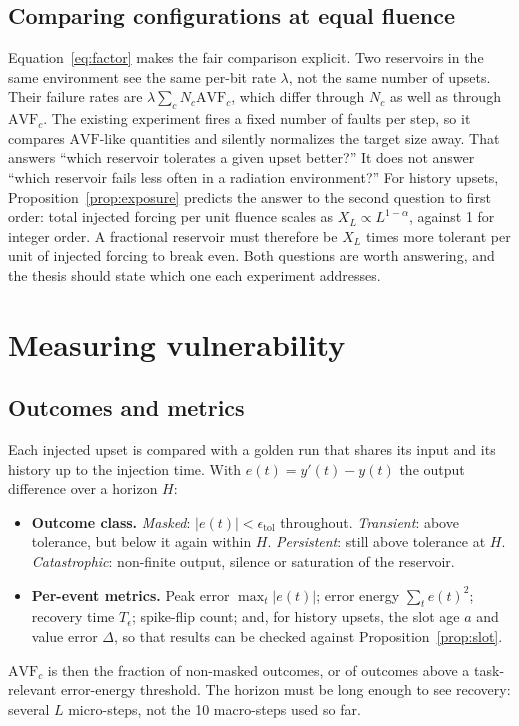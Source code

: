 \documentclass[11pt,a4paper]{article}
\newcommand{\AVF}{\mathrm{AVF}}
\begin{document}
\subsection{Comparing configurations at equal fluence}
\label{sec:fluence}

Equation~\eqref{eq:factor} makes the fair comparison explicit. Two reservoirs in the same environment see the same per-bit rate $\lambda$, not the same number of upsets. Their failure rates are $\lambda \sum_c N_c \AVF_c$, which differ through $N_c$ as well as through $\AVF_c$. The existing experiment fires a fixed number of faults per step, so it compares $\AVF$-like quantities and silently normalizes the target size away. That answers ``which reservoir tolerates a given upset better?'' It does not answer ``which reservoir fails less often in a radiation environment?'' For history upsets, Proposition~\ref{prop:exposure} predicts the answer to the second question to first order: total injected forcing per unit fluence scales as $X_L \propto L^{1-\alpha}$, against 1 for integer order. A fractional reservoir must therefore be $X_L$ times more tolerant per unit of injected forcing to break even. Both questions are worth answering, and the thesis should state which one each experiment addresses.

\section{Measuring vulnerability}
\label{sec:metrics}

\subsection{Outcomes and metrics}

Each injected upset is compared with a golden run that shares its input and its history up to the injection time. With $e(t) = y'(t) - y(t)$ the output difference over a horizon $H$:
\begin{itemize}
  \item \textbf{Outcome class.} \emph{Masked}: $|e(t)| < \epsilon_{\mathrm{tol}}$ throughout. \emph{Transient}: above tolerance, but below it again within $H$. \emph{Persistent}: still above tolerance at $H$. \emph{Catastrophic}: non-finite output, silence or saturation of the reservoir.
  \item \textbf{Per-event metrics.} Peak error $\max_t |e(t)|$; error energy $\sum_t e(t)^2$; recovery time $T_\epsilon$; spike-flip count; and, for history upsets, the slot age $a$ and value error $\Delta$, so that results can be checked against Proposition~\ref{prop:slot}.
\end{itemize}
$\AVF_c$ is then the fraction of non-masked outcomes, or of outcomes above a task-relevant error-energy threshold. The horizon must be long enough to see recovery: several $L$ micro-steps, not the 10 macro-steps used so far.
\end{document}
